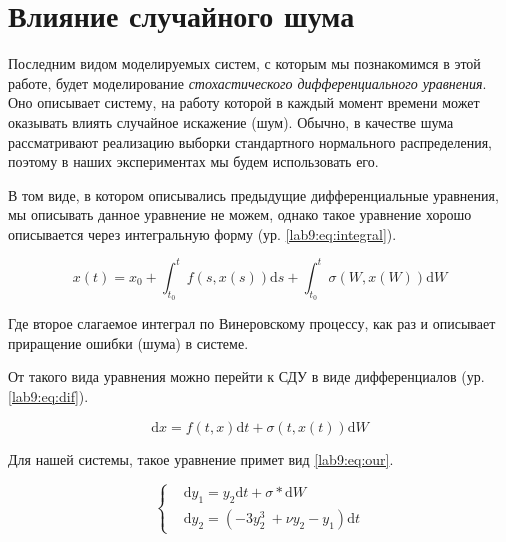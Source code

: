 \chapter{Влияние случайного шума}\label{lab9}
Последним видом моделируемых систем, с которым мы познакомимся
в этой работе, будет моделирование \textit{стохастического
дифференциального уравнения}. Оно описывает систему, на работу
которой в каждый момент времени может оказывать влиять
случайное искажение (шум). Обычно, в качестве шума рассматривают
реализацию выборки стандартного нормального распределения,
поэтому в наших экспериментах мы будем использовать его.

В том виде, в котором описывались предыдущие дифференциальные
уравнения, мы описывать данное уравнение не можем, однако
такое уравнение хорошо описывается через интегральную форму
(ур. \ref{lab9:eq:integral}).

\begin{equation}\label{lab9:eq:integral}
    x(t) = x_0 + \int_{t_0}^t f(s,x(s))\mathrm{d}s +
                 \int_{t_0}^t \sigma(W, x(W))\mathrm{d}W
\end{equation}

Где второе слагаемое интеграл по Винеровскому процессу,
как раз и описывает приращение ошибки (шума) в системе.


От такого вида уравнения можно перейти к СДУ в виде
дифференциалов (ур. \ref{lab9:eq:dif}).

\begin{equation}\label{lab9:eq:dif}
    \mathrm{d}x = f(t, x)\mathrm{d}t +
                  \sigma(t, x(t))\mathrm{d}W
\end{equation}

Для нашей системы, такое уравнение примет вид \ref{lab9:eq:our}.

\begin{equation}\label{lab9:eq:our}
\begin{cases}
    &\mathrm{d}y_1 = y_2\mathrm{d}t + \sigma * \mathrm{d}W\\
    &\mathrm{d}y_2 = (-3y_2^3\ + \nu y_2 - y_1)\mathrm{d}t
\end{cases}
\end{equation}

